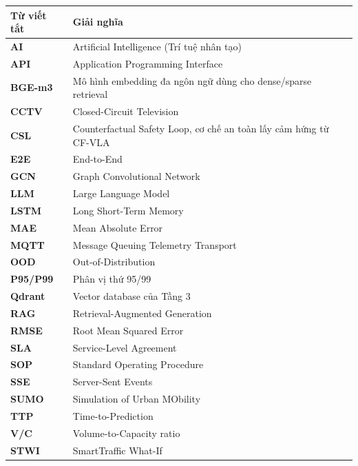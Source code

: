 \renewcommand{\arraystretch}{1.35}
\begin{longtable}{>{\bfseries}p{3.5cm} p{10.5cm}}
\toprule
\textbf{Từ viết tắt} & \textbf{Giải nghĩa} \\
\midrule
\endhead
\bottomrule
\endlastfoot
AI & Artificial Intelligence (Trí tuệ nhân tạo) \\
API & Application Programming Interface \\
BGE-m3 & Mô hình embedding đa ngôn ngữ dùng cho dense/sparse retrieval \\
CCTV & Closed-Circuit Television \\
CSL & Counterfactual Safety Loop, cơ chế an toàn lấy cảm hứng từ CF-VLA \\
E2E & End-to-End \\
GCN & Graph Convolutional Network \\
LLM & Large Language Model \\
LSTM & Long Short-Term Memory \\
MAE & Mean Absolute Error \\
MQTT & Message Queuing Telemetry Transport \\
OOD & Out-of-Distribution \\
P95/P99 & Phân vị thứ 95/99 \\
Qdrant & Vector database của Tầng 3 \\
RAG & Retrieval-Augmented Generation \\
RMSE & Root Mean Squared Error \\
SLA & Service-Level Agreement \\
SOP & Standard Operating Procedure \\
SSE & Server-Sent Events \\
SUMO & Simulation of Urban MObility \\
TTP & Time-to-Prediction \\
V/C & Volume-to-Capacity ratio \\
STWI & SmartTraffic What-If \\
\end{longtable}
